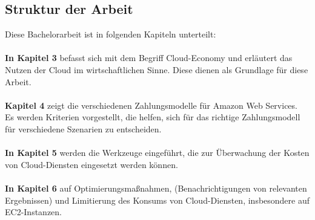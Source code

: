 
\subsection{Struktur der Arbeit}

Diese Bachelorarbeit ist in folgenden Kapiteln unterteilt:\\\\
\textbf{In Kapitel 3} 
befasst sich mit dem Begriff Cloud-Economy und erläutert das Nutzen der Cloud im wirtschaftlichen Sinne. Diese dienen als Grundlage für diese Arbeit. \\\\
\textbf{Kapitel 4} 
zeigt die verschiedenen Zahlungsmodelle für Amazon Web Services. 
\\
Es werden Kriterien vorgestellt, die helfen, sich für das richtige Zahlungsmodell für verschiedene Szenarien zu entscheiden. 
\\\\
\textbf{In Kapitel 5} werden die Werkzeuge eingeführt, die zur Überwachung der Kosten von Cloud-Diensten eingesetzt werden können.
\\\\
\textbf{In Kapitel 6} auf Optimierungsmaßnahmen, (Benachrichtigungen von relevanten Ergebnissen) und Limitierung des Konsums von Cloud-Diensten, insbesondere auf EC2-Instanzen.

 
